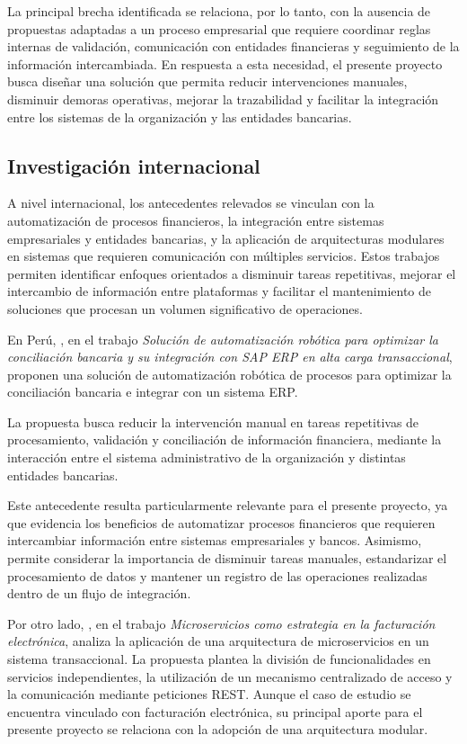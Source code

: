 La principal brecha identificada se relaciona, por lo tanto, con la ausencia de propuestas adaptadas a un proceso empresarial que requiere coordinar reglas internas de validación, comunicación con entidades financieras y seguimiento de la información intercambiada. En respuesta a esta necesidad, el presente proyecto busca diseñar una solución que permita reducir intervenciones manuales, disminuir demoras operativas, mejorar la trazabilidad y facilitar la integración entre los sistemas de la organización y las entidades bancarias.

\subsection{Investigación internacional}

A nivel internacional, los antecedentes relevados se vinculan con la automatización de procesos financieros, la integración entre sistemas empresariales y entidades bancarias, y la aplicación de arquitecturas modulares en sistemas que requieren comunicación con múltiples servicios. Estos trabajos permiten identificar enfoques orientados a disminuir tareas repetitivas, mejorar el intercambio de información entre plataformas y facilitar el mantenimiento de soluciones que procesan un volumen significativo de operaciones.

En Perú, \citet{barba2023}, en el trabajo \emph{Solución de automatización robótica para optimizar la conciliación bancaria y su integración con SAP ERP en alta carga transaccional}, proponen una solución de automatización robótica de procesos para optimizar la conciliación bancaria e integrar con un sistema ERP.

La propuesta busca reducir la intervención manual en tareas repetitivas de procesamiento, validación y conciliación de información financiera, mediante la interacción entre el sistema administrativo de la organización y distintas entidades bancarias.

Este antecedente resulta particularmente relevante para el presente proyecto, ya que evidencia los beneficios de automatizar procesos financieros que requieren intercambiar información entre sistemas empresariales y bancos. Asimismo, permite considerar la importancia de disminuir tareas manuales, estandarizar el procesamiento de datos y mantener un registro de las operaciones realizadas dentro de un flujo de integración.

Por otro lado, \citet{canqui2021}, en el trabajo \emph{Microservicios como estrategia en la facturación electrónica}, analiza la aplicación de una arquitectura de microservicios en un sistema transaccional. La propuesta plantea la división de funcionalidades en servicios independientes, la utilización de un mecanismo centralizado de acceso y la comunicación mediante peticiones REST. Aunque el caso de estudio se encuentra vinculado con facturación electrónica, su principal aporte para el presente proyecto se relaciona con la adopción de una arquitectura modular.

